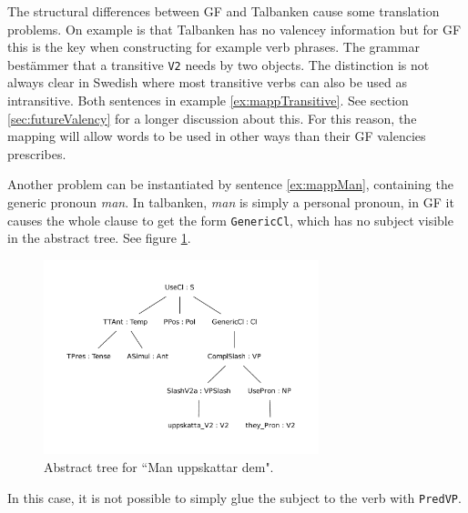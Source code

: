 \documentclass{report}
\begin{document}

The structural differences between GF and Talbanken cause some translation problems.
On example is that Talbanken has no valencey information but for GF this is the key when
constructing for example verb phrases. The grammar bestämmer that a transitive \verb|V2|
needs by two objects. The distinction is not always clear in Swedish where 
most transitive verbs can also be used as intransitive. Both sentences in
example \ref{ex:mappTransitive}.
 \label{ex:mappTransitive}
See section \ref{sec:futureValency} for a longer discussion about this.
For this reason, the mapping will allow words to be used in other ways than their
GF valencies prescribes.

Another problem can be instantiated by sentence \ref{ex:mappMan}, containing the generic pronoun \emph{man}.
\label{ex:mappMan} %
In talbanken, \emph{man} is simply a personal pronoun, 
in GF it causes the whole clause to get the form \verb|GenericCl|, which has no
subject visible in the abstract tree. See figure \ref{fig:mappMan}.
\begin{figure}[h]
\centering
\includegraphics[width=80mm]{man.pdf}
\caption{Abstract tree for ``Man uppskattar dem".}
\label{fig:mappMan}
\end{figure}
In this case, it is not possible to simply glue the subject to the verb with \verb|PredVP|.
\end{document}
